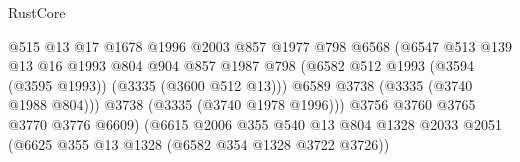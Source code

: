 \begin{lexlean}{RustCore}
\begin{coremodule}
                                                @515
                                                @13
                                                @17
                                                @1678
                                                @1996
                                                @2003
                                                @857
                                                @1977
                                                @798
                                                @6568
                                                (@6547
                                                  @513
                                                  @139
                                                  @13
                                                  @16
                                                  @1993
                                                  @804
                                                  @904
                                                  @857
                                                  @1987
                                                  @798
                                                  (@6582
                                                    @512
                                                    @1993
                                                    (@3594 (@3595 @1993))
                                                    (@3335 (@3600 @512 @13)))
                                                  @6589
                                                  @3738
                                                  (@3335 (@3740 @1988 @804)))
                                                @3738
                                                (@3335 (@3740 @1978 @1996)))
                                              @3756
                                              @3760
                                              @3765
                                              @3770
                                              @3776
                                              @6609)
                                            (@6615
                                              @2006
                                              @355
                                              @540
                                              @13
                                              @804
                                              @1328
                                              @2033
                                              @2051
                                              (@6625 @355 @13 @1328 (@6582 @354 @1328 @3722 @3726))

\end{coremodule}
\end{lexlean}
